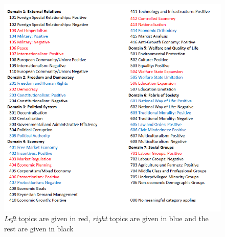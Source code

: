 \documentclass[11pt,a4paper]{article}
\begin{document}
\begin{figure}[!ht]
\centering
\includegraphics[width=1\linewidth]{CMP_Coding_1.png}
\caption{\textit{Left} topics are given in red, \textit{right} topics are given in blue and the rest are given in black}
\label{fig:CMP}
\end{figure}







 
\end{document}
